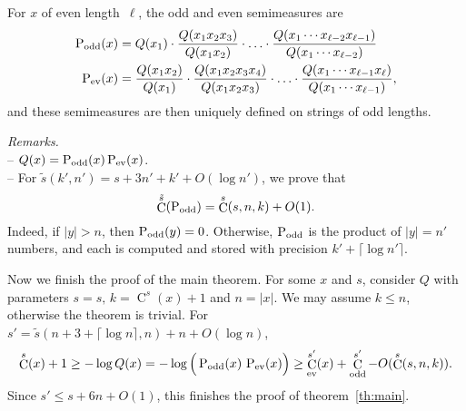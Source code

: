 \documentclass[runningheads]{llncs}
\DeclareMathOperator{\C}{C} \newcommand{\Cev}{\C_\textnormal{ev}} \newcommand{\Codd}{\C_\textnormal{odd}}
\DeclareMathOperator{\Pev}{P_{\textnormal{ev}}} \DeclareMathOperator{\Podd}{P_{\textnormal{odd}}} \DeclareMathOperator{\Pc}{PC}
\begin{document}
For $x$ of even length~$\ell$, the odd and even semimeasures are 
\begin{align*}
  \Podd(x) &= Q(x_1) \cdot \frac {Q(x_1x_2x_3)}{Q(x_1x_2)} \cdot \ldots \cdot \frac {Q(x_1 \cdots x_{\ell-2}x_{\ell-1})}{Q(x_1 \cdots x_{\ell-2})} \\
  \Pev(x) &= \frac {Q(x_1x_2)} {Q(x_1)} \cdot \frac {Q(x_1x_2x_3x_4)}{Q(x_1x_2x_3)} \cdot \ldots \cdot \frac {Q(x_1 \cdots x_{\ell-1}x_{\ell})}{Q(x_1 \cdots x_{\ell-1})}, 
\end{align*}
and these semimeasures are then uniquely defined on strings of odd lengths.  

\medskip
\noindent
{\em Remarks.} 
\\-- $Q(x) = \Podd(x)\Pev(x)$.
\\-- For $\tilde s(k',n') = s + 3n' + k' + O(\log n')$, we prove that
\[
  \C^{\tilde s}(\Podd) = \C^s(s,n,k) + O(1).  
\]
Indeed, if $|y| > n$, then $\Podd(y) = 0$. Otherwise, $\Podd$ is the product of $|y| = n'$ numbers, and each is computed and stored with precision $k' + \lceil\log n' \rceil$. 

\medskip
\noindent
Now we finish the proof of the main theorem. For some $x$ and $s$, consider $Q$ with parameters $s = s,\, k = \C^s(x) + 1$ and $n = |x|$. 
We may assume $k \le n$, otherwise the theorem is trivial.  For $s' = \tilde s(n + 3 + \lceil \log n \rceil,n) + n + O(\log n)$, 
\[
  \C^s(x) + 1 \ge - \log Q(x) = - \log \Big(\Podd(x) \, \Pev(x)\Big) \ge \Cev^{s'}(x) + \Codd^{s'} - O(\C^s(s,n,k)).
\]
Since $s' \le s + 6n + O(1)$, this finishes the proof of theorem~\ref{th:main}.  





\end{document}
